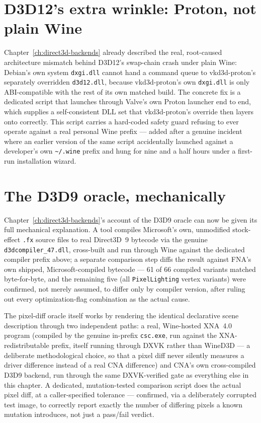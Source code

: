 \section{D3D12's extra wrinkle: Proton, not plain Wine}
\label{sec:proton-wrinkle}

Chapter~\ref{ch:direct3d-backends} already described the real, root-caused
architecture mismatch behind D3D12's swap-chain crash under plain Wine: Debian's own system
\texttt{dxgi.dll} cannot hand a command queue to vkd3d-proton's separately overridden
\texttt{d3d12.dll}, because vkd3d-proton's own \texttt{dxgi.dll} is only ABI-compatible with
the rest of its own matched build. The concrete fix is a dedicated script that launches
through Valve's own Proton launcher end to end, which supplies a self-consistent DLL set that
vkd3d-proton's override then layers onto correctly. This script carries a hard-coded safety
guard refusing to ever operate against a real personal Wine prefix --- added after a genuine
incident where an earlier version of the same script accidentally launched against a
developer's own \texttt{\textasciitilde/.wine} prefix and hung for nine and a half hours
under a first-run installation wizard.

\section{The D3D9 oracle, mechanically}
\label{sec:d3d9-oracle}

Chapter~\ref{ch:direct3d-backends}'s account of the D3D9 oracle can now be given its full
mechanical explanation. A tool compiles Microsoft's own, unmodified stock-effect \texttt{.fx}
source files to real Direct3D~9 bytecode via the genuine \texttt{d3dcompiler\_47.dll},
cross-built and run through Wine against the dedicated compiler prefix above; a separate
comparison step diffs the result against FNA's own shipped, Microsoft-compiled bytecode ---
61 of 66 compiled variants matched byte-for-byte, and the remaining five (all
\texttt{PixelLighting} vertex variants) were confirmed, not merely assumed, to differ only by
compiler version, after ruling out every optimization-flag combination as the actual cause.

The pixel-diff oracle itself works by rendering the identical declarative scene description
through two independent paths: a real, Wine-hosted XNA~4.0 program (compiled by the genuine
in-prefix \texttt{csc.exe}, run against the XNA-redistributable prefix, itself running
through DXVK rather than WineD3D --- a deliberate methodological choice, so that a pixel diff
never silently measures a driver difference instead of a real CNA difference) and CNA's own
cross-compiled D3D9 backend, run through the same DXVK-verified gate as everything else in
this chapter. A dedicated, mutation-tested comparison script does the actual pixel diff, at
a caller-specified tolerance --- confirmed, via a deliberately corrupted test image, to
correctly report exactly the number of differing pixels a known mutation introduces, not just
a pass/fail verdict.


